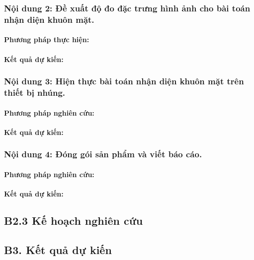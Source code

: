 \documentclass[letterpaper]{article}
\begin{document}
\subsubsection{Nội dung 2: Đề xuất độ đo đặc trưng hình ảnh cho bài toán nhận diện khuôn mặt.}

\paragraph{Phương pháp thực hiện:}

\paragraph{Kết quả dự kiến:}

\subsubsection{Nội dung 3: Hiện thực bài toán nhận diện khuôn mặt trên thiết
bị nhúng. }

\paragraph{Phương pháp nghiên cứu:}

\paragraph{Kết quả dự kiến:}

\subsubsection{Nội dung 4: Đóng gói sản phẩm và viết báo cáo.}

\paragraph{Phương pháp nghiên cứu:}

\paragraph{Kết quả dự kiến:}

\subsection{B2.3 Kế hoạch nghiên cứu}



\subsection{B3. Kết quả dự kiến}
\end{document}
